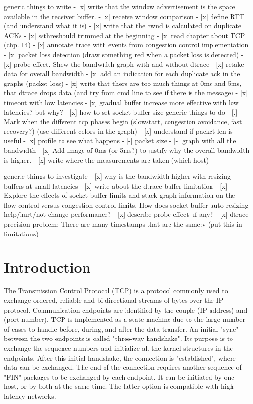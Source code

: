 \documentclass[a4paper,10pt]{article}
\begin{document}
generic things to write
- [x] write that the window advertisement is the space available in the receiver buffer.
- [x] receive window comparison
- [x] define RTT (and understand what it is)
- [x] write that the cwnd is calculated on duplicate ACKs
- [x] ssthreshould trimmed at the beginning
- [x] read chapter about TCP (chp. 14)
- [x] annotate trace with events from congestion control implementation
- [x] packet loss detection (draw something red when a packet loss is detected)
- [x] probe effect. Show the bandwidth graph with and without dtrace
- [x] retake data for overall bandwidth
- [x] add an indication for each duplicate ack in the graphs (packet loss)
- [x] write that there are too much things at 0ms and 5ms, that dtrace drops data (and try from cmd line to see if there is the message)
- [x] timeout with low latencies
- [x] gradual buffer increase more effective with low latencies? but why?
- [x] how to set socket buffer size
generic things to do 
- [.] Mark when  the different tcp phases begin (slowstart, congestion avoidance, fast recovery?) (use different colors in the graph)
- [x] understand if packet len is useful
- [x] profile to see what happens
- [-] packet size
- [-] graph with all the bandwidth
- [x] Add image of 0ms (or 5ms?) to justify why the overall bandwidth is higher.
- [x] write where the measurements are taken (which host)

generic things to investigate
- [x] why is the bandwidth higher with resizing buffers at small latencies
- [x] write about the dtrace buffer limitation
- [x] Explore the effects of socket-buffer limits and stack graph information on the flow-control versus congestion-control limits. How does socket-buffer auto-resizing help/hurt/not change performance? 
- [x] describe probe effect, if any?
- [x] dtrace precision problem; There are many timestamps that are the same:v (put this in limitations)
\fi

\clearpage

\setcounter{page}{1}

\section{Introduction}
The Transmission Control Protocol (TCP) is a protocol commonly used to exchange ordered, reliable and bi-directional streams of bytes over the IP protocol. Communication endpoints are identified by the couple (IP address) and (port number). 
TCP is implemented as a state machine due to the large number of cases to handle before, during, and after the data transfer. An initial "sync" between the two endpoints is called "three-way handshake". Its purpose is to exchange the sequence numbers and initialize all the kernel structures in the endpoints.
After this initial handshake, the connection is "established", where data can be exchanged.
The end of the connection requires another sequence of "FIN" packages to be exchanged by each endpoint. It can be initiated by one host, or by both at the same time. The latter option is compatible with high latency networks.
\end{document}
